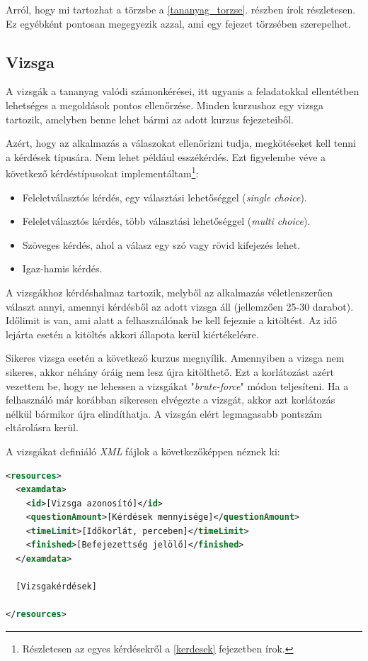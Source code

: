 \documentclass[12pt,a4paper]{article}
\newcommand{\xml}{\textit{XML}\xspace}
\begin{document}
	Arról, hogy mi tartozhat a törzsbe a \ref{tananyag_torzse}. részben írok részletesen. Ez egyébként pontosan megegyezik azzal, ami egy fejezet törzsében szerepelhet.

	\subsection{Vizsga}\label{vizsga}
	
	A vizsgák a tananyag valódi számonkérései, itt ugyanis a feladatokkal ellentétben lehetséges a megoldások pontos ellenőrzése. Minden kurzushoz egy vizsga tartozik, amelyben benne lehet bármi az adott kurzus fejezeteiből.
	
	Azért, hogy az alkalmazás a válaszokat ellenőrizni tudja, megkötéseket kell tenni a kérdések típusára. Nem lehet például esszékérdés. Ezt figyelembe véve a következő kérdéstípusokat implementáltam\footnote{Részletesen az egyes kérdésekről a \ref{kerdesek} fejezetben írok.}:
	
	\begin{itemize}
		\item Feleletválasztós kérdés, egy választási lehetőséggel (\textit{single choice}).
		\item Feleletválasztós kérdés, több választási lehetőséggel (\textit{multi choice}).
		\item Szöveges kérdés, ahol a válasz egy szó vagy rövid kifejezés lehet.
		\item Igaz-hamis kérdés.
	\end{itemize}
	
	A vizsgákhoz kérdéshalmaz tartozik, melyből az alkalmazás véletlenszerűen választ annyi, amennyi kérdésből az adott vizsga áll (jellemzően 25-30 darabot). Időlimit is van, ami alatt a felhasználónak be kell fejeznie a kitöltést. Az idő lejárta esetén a kitöltés akkori állapota kerül kiértékelésre.
	
	Sikeres vizsga esetén a következő kurzus megnyílik. Amennyiben a vizsga nem sikeres, akkor néhány óráig nem lesz újra kitölthető. Ezt a korlátozást azért vezettem be, hogy ne lehessen a vizsgákat "\textit{brute-force}" módon teljesíteni. Ha a felhasználó már korábban sikeresen elvégezte a vizsgát, akkor azt korlátozás nélkül bármikor újra elindíthatja. A vizsgán elért legmagasabb pontszám eltárolásra kerül.
	
	A vizsgákat definiáló \xml fájlok a következőképpen néznek ki:
	
	\bigskip
	\begin{lstlisting}[language=XML]
<resources>
  <examdata>
	<id>[Vizsga azonosító]</id>
	<questionAmount>[Kérdések mennyisége]</questionAmount>
	<timeLimit>[Időkorlát, perceben]</timeLimit>
    <finished>[Befejezettség jelölő]</finished>
  </examdata>
  
  [Vizsgakérdések]
  
</resources>
	\end{lstlisting}
\end{document}
